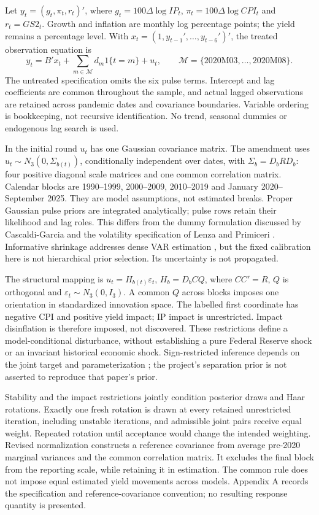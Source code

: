 \documentclass[11pt,a4paper]{article}
\begin{document}
Let $y_t=(g_t,\pi_t,r_t)'$, where $g_t=100\Delta\log IP_t$, $\pi_t=100\Delta\log CPI_t$ and $r_t=GS2_t$. Growth and inflation are monthly log percentage points; the yield remains a percentage level. With $x_t=(1,y_{t-1}',\ldots,y_{t-6}')'$, the treated observation equation is
\[
 y_t=B'x_t+\sum_{m\in\mathcal M}d_m1\{t=m\}+u_t,
 \qquad \mathcal M=\{2020\mathrm{M}03,\ldots,2020\mathrm{M}08\}.
\]
The untreated specification omits the six pulse terms. Intercept and lag coefficients are common throughout the sample, and actual lagged observations are retained across pandemic dates and covariance boundaries. Variable ordering is bookkeeping, not recursive identification. No trend, seasonal dummies or endogenous lag search is used.

In the initial round $u_t$ has one Gaussian covariance matrix. The amendment uses $u_t\sim N_3(0,\Sigma_{b(t)})$, conditionally independent over dates, with $\Sigma_b=D_bRD_b$: four positive diagonal scale matrices and one common correlation matrix. Calendar blocks are 1990--1999, 2000--2009, 2010--2019 and January 2020--September 2025. They are model assumptions, not estimated breaks. Proper Gaussian pulse priors are integrated analytically; pulse rows retain their likelihood and lag roles. This differs from the dummy formulation discussed by Cascaldi-Garcia \cite{cg2022} and the volatility specification of Lenza and Primiceri \cite{lp2022}. Informative shrinkage addresses dense VAR estimation \cite{glp2015}, but the fixed calibration here is not hierarchical prior selection. Its uncertainty is not propagated.

The structural mapping is $u_t=H_{b(t)}\varepsilon_t$, $H_b=D_bCQ$, where $CC'=R$, $Q$ is orthogonal and $\varepsilon_t\sim N_3(0,I_3)$. A common $Q$ across blocks imposes one orientation in standardized innovation space. The labelled first coordinate has negative CPI and positive yield impact; IP impact is unrestricted. Impact disinflation is therefore imposed, not discovered. These restrictions define a model-conditional disturbance, without establishing a pure Federal Reserve shock or an invariant historical economic shock. Sign-restricted inference depends on the joint target and parameterization \cite{arw2018}; the project's separation prior is not asserted to reproduce that paper's prior.

Stability and the impact restrictions jointly condition posterior draws and Haar rotations. Exactly one fresh rotation is drawn at every retained unrestricted iteration, including unstable iterations, and admissible joint pairs receive equal weight. Repeated rotation until acceptance would change the intended weighting. Revised normalization constructs a reference covariance from average pre-2020 marginal variances and the common correlation matrix. It excludes the final block from the reporting scale, while retaining it in estimation. The common rule does not impose equal estimated yield movements across models. Appendix A records the specification and reference-covariance convention; no resulting response quantity is presented.
\end{document}
